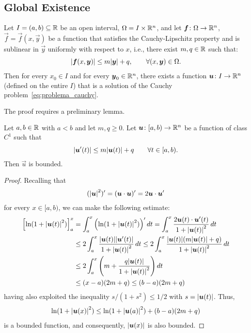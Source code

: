 \subsection{Global Existence}

\begin{theorem}
\label{th:edo_esistenza_globale}
Let $I = (a,b) \subseteq {\mathbb R}$ be an open interval, $\Omega=I\times {\mathbb R}^n$, and let
$\boldsymbol f\colon \Omega \to {\mathbb R}^n$, $\vec f = \vec f(x,\vec y)$ be a function that
satisfies the Cauchy-Lipschitz property and is sublinear in $\vec y$ uniformly
with respect to $x$, i.e., there exist $m,q\in {\mathbb R}$ such that:
\[
  {\left|\boldsymbol f(x,\boldsymbol y)\right|} \le m{\left|\boldsymbol y\right|} + q,
  \qquad\forall (x,\boldsymbol y)\in \Omega.
\]
Then for every $x_0\in I$ and for every $\boldsymbol y_0\in {\mathbb R}^n$, there exists a
function $\boldsymbol u\colon I \to {\mathbb R}^n$ (defined on the entire $I$) that is a
solution of the Cauchy problem~\eqref{eq:problema_cauchy}.
\end{theorem}
%
The proof requires a preliminary lemma.
\begin{lemma}[Gronwall]
Let $a,b\in {\mathbb R}$ with $a<b$ and let $m,q\ge 0$. Let $\boldsymbol u \colon [a,b) \to
{\mathbb R}^n$ be a function of class $C^1$ such that
\[
  {\left|\boldsymbol u'(t)\right|} \le m {\left|\boldsymbol u(t)\right|} + q
  \qquad \forall t\in [a,b).
\]
Then $\vec u$ is bounded.
\end{lemma}
%
\begin{proof}
Recalling that
\[
  ({\left|\boldsymbol u\right|}^2)'
  = (\boldsymbol u\cdot \boldsymbol u)'
  = 2 \boldsymbol u \cdot \boldsymbol u'
\]
for every $x\in [a,b)$, we can make the following estimate:
\begin{align*}
{\left[ \ln(1+{\left|\boldsymbol u(t)\right|}^2) \right]}_{a}^{x}
&= \int_{a}^{x}
  {\left( \ln(1+{\left|\boldsymbol u(t)\right|}^2) \right)}' \, dt
= \int_{a}^{x}
\frac{2\boldsymbol u(t)\cdot \boldsymbol u'(t)}{1+{\left|\boldsymbol u(t)\right|}^2}\, dt \\
&\le 2 \int_{a}^{x} \frac{{\left|\boldsymbol u(t)\right|} {\left|\boldsymbol u'(t)\right|}}{1+{\left|\boldsymbol u(t)\right|}^2}\, dt
\le 2\int_{a}^{x} \frac{{\left|\boldsymbol u(t)\right|}{\left( m{\left|\boldsymbol u(t)\right|}+q \right)}}{1+{\left|\boldsymbol u(t)\right|}^2}\, dt\\
&\le 2\int_{a}^{x} {\left( m + \frac{q{\left|\boldsymbol u(t)\right|}}{1+{\left|\boldsymbol u(t)\right|}^2} \right)}\,
dt\\
&\le (x-a)(2m + q) \le (b-a)(2m+q)
\end{align*}
having also exploited the inequality $s/(1+s^2) \le 1/2$ with $s={\left|\boldsymbol u(t)\right|}$. Thus,
\[
  \ln(1+{\left|\boldsymbol u(x)\right|}^2) \le \ln(1+{\left|\boldsymbol u(a)\right|}^2) + (b-a)(2m+q)
\]
is a bounded function, and consequently, ${\left|\boldsymbol u(x)\right|}$ is also bounded.
\end{proof}

